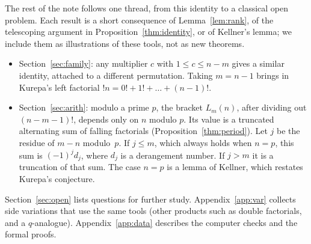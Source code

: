 \documentclass[11pt]{amsart}
\theoremstyle{plain}
\theoremstyle{definition}
\theoremstyle{remark}
\begin{document}
The rest of the note follows one thread, from this identity to a classical
open problem. Each result is a short consequence of Lemma~\ref{lem:rank}, of
the telescoping argument in Proposition~\ref{thm:identity}, or of Kellner's
lemma; we include them as illustrations of these tools, not as new theorems.
\begin{itemize}
  \item Section~\ref{sec:family}: any multiplier $c$ with $1\le c\le n-m$ gives
        a similar identity, attached to a different permutation. Taking $m=n-1$
        brings in Kurepa's left factorial $!n=0!+1!+\dots+(n-1)!$.
  \item Section~\ref{sec:arith}: modulo a prime $p$, the bracket $L_m(n)$,
        after dividing out $(n-m-1)!$, depends only on $n$ modulo $p$. Its
        value is a truncated alternating sum of falling factorials
        (Proposition~\ref{thm:period}). Let $j$ be the residue of $m-n$
        modulo~$p$. If $j\le m$, which always holds when $n=p$, this sum is
        $(-1)^jd_j$, where $d_j$ is a derangement number. If $j>m$ it is a
        truncation of that sum. The case $n=p$ is a lemma of Kellner,
        which restates Kurepa's conjecture.
\end{itemize}
Section~\ref{sec:open} lists questions for further study.
Appendix~\ref{app:var} collects side variations that use the same tools (other
products such as double factorials, and a $q$-analogue). Appendix~\ref{app:data} describes the computer checks
and the formal proofs.
\end{document}
